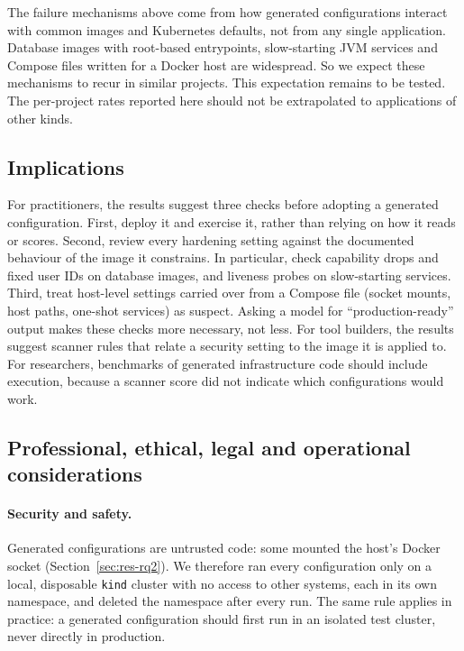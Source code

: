 The failure mechanisms above come from how generated configurations interact with common images and Kubernetes defaults, not from any single application. Database images with root-based entrypoints, slow-starting JVM services and Compose files written for a Docker host are widespread. So we expect these mechanisms to recur in similar projects. This expectation remains to be tested. The per-project rates reported here should not be extrapolated to applications of other kinds.

\subsection{Implications}\label{sec:disc-implications}

For practitioners, the results suggest three checks before adopting a generated configuration. First, deploy it and exercise it, rather than relying on how it reads or scores. Second, review every hardening setting against the documented behaviour of the image it constrains. In particular, check capability drops and fixed user IDs on database images, and liveness probes on slow-starting services. Third, treat host-level settings carried over from a Compose file (socket mounts, host paths, one-shot services) as suspect. Asking a model for ``production-ready'' output makes these checks more necessary, not less. For tool builders, the results suggest scanner rules that relate a security setting to the image it is applied to. For researchers, benchmarks of generated infrastructure code should include execution, because a scanner score did not indicate which configurations would work.

\subsection{Professional, ethical, legal and operational considerations}\label{sec:disc-professional}

\paragraph{Security and safety.} Generated configurations are untrusted code: some mounted the host's Docker socket (Section~\ref{sec:res-rq2}). We therefore ran every configuration only on a local, disposable \texttt{kind} cluster with no access to other systems, each in its own namespace, and deleted the namespace after every run. The same rule applies in practice: a generated configuration should first run in an isolated test cluster, never directly in production.

